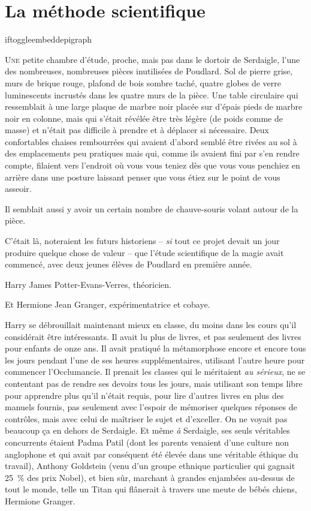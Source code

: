 \chapter{La méthode scientifique}

iftoggle{embeddepigraph}{}{}

\lettrine{U}{ne} petite chambre d'étude, proche, mais pas dans le dortoir de Serdaigle, l'une des nombreuses, nombreuses pièces inutilisées de Poudlard. Sol de pierre grise, murs de brique rouge, plafond de bois sombre taché, quatre globes de verre luminescents incrustés dans les quatre murs de la pièce. Une table circulaire qui ressemblait à une large plaque de marbre noir placée sur d'épais pieds de marbre noir en colonne, mais qui s'était révélée être très légère (de poids comme de masse) et n'était pas difficile à prendre et à déplacer si nécessaire. Deux confortables chaises rembourrées qui avaient d'abord semblé être rivées au sol à des emplacements peu pratiques mais qui, comme ils avaient fini par s'en rendre compte, filaient vers l'endroit où vous vous teniez dès que vous vous penchiez en arrière dans une posture laissant penser que vous étiez sur le point de vous asseoir.

Il semblait aussi y avoir un certain nombre de chauve-souris volant autour de la pièce.

C'était là, noteraient les futurs historiens -- \emph{si} tout ce projet devait un jour produire quelque chose de valeur -- que l'étude scientifique de la magie avait commencé, avec deux jeunes élèves de Poudlard en première année.

Harry James Potter-Evans-Verres, théoricien.

Et Hermione Jean Granger, expérimentatrice et cobaye.

Harry se débrouillait maintenant mieux en classe, du moins dans les cours qu'il considérait être intéressants. Il avait lu plus de livres, et pas seulement des livres pour enfants de onze ans. Il avait pratiqué la métamorphose encore et encore tous les jours pendant l'une de ses heures supplémentaires, utilisant l'autre heure pour commencer l'Occlumancie. Il prenait les classes qui le méritaient \emph{au sérieux}, ne se contentant pas de rendre ses devoirs tous les jours, mais utilisant son temps libre pour apprendre plus qu'il n'était requis, pour lire d'autres livres en plus des manuels fournis, pas seulement avec l'espoir de mémoriser quelques réponses de contrôles, mais avec celui de maîtriser le sujet et d'exceller. On ne voyait pas beaucoup ça en dehors de Serdaigle. Et même \emph{à} Serdaigle, ses seuls véritables concurrents étaient Padma Patil (dont les parents venaient d'une culture non anglophone et qui avait par conséquent été élevée dans une véritable éthique du travail), Anthony Goldstein (venu d'un groupe ethnique particulier qui gagnait 25~\% des prix Nobel), et bien sûr, marchant à grandes enjambées au-dessus de tout le monde, telle un Titan qui flânerait à travers une meute de bébés chiens, Hermione Granger.

